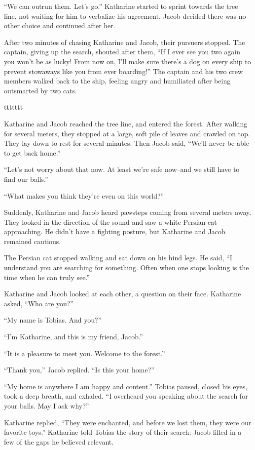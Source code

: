 “We can outrun them. Let's go.” Katharine started to sprint towards the tree line, not waiting for him to verbalize his agreement. Jacob decided there was no other choice and continued after her.

After two minutes of chasing Katharine and Jacob, their pursuers stopped. The captain, giving up the search, shouted after them, “If I ever see you two again you won't be as lucky! From now on, I'll make sure there's a dog on every ship to prevent stowaways like you from ever boarding!” The captain and his two crew members walked back to the ship, feeling angry and humiliated after being outsmarted by two cats.



ttttttt



Katharine and Jacob reached the tree line, and entered the forest. After walking for several meters, they stopped at a large, soft pile of leaves and crawled on top. They lay down to rest for several minutes. Then Jacob said, “We'll never be able to get back home.”

“Let's not worry about that now. At least we're safe now–and we still have to find our balls.”

“What makes you think they're even on this world?”

Suddenly, Katharine and Jacob heard pawsteps coming from several meters away. They looked in the direction of the sound and saw a white Persian cat approaching. He didn't have a fighting posture, but Katharine and Jacob remained cautious.

The Persian cat stopped walking and sat down on his hind legs. He said, “I understand you are searching for something. Often when one stops looking is the time when he can truly see.”

Katharine and Jacob looked at each other, a question on their face. Katharine asked, “Who are you?”

“My name is Tobias. And you?”

“I'm Katharine, and this is my friend, Jacob.”

“It is a pleasure to meet you. Welcome to the forest.”

“Thank you,” Jacob replied. “Is this your home?”

“My home is anywhere I am happy and content.” Tobias paused, closed his eyes, took a deep breath, and exhaled. “I overheard you speaking about the search for your balls. May I ask why?”

Katharine replied, “They were enchanted, and before we lost them, they were our favorite toys.” Katharine told Tobias the story of their search; Jacob filled in a few of the gaps he believed relevant.


